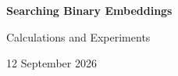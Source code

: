 \documentclass[11pt,a4paper]{article}
\begin{document}
{\Large\bfseries\color{Ink} Searching Binary Embeddings}\par
{\large Calculations and Experiments}\par
{\small 12 September 2026}\par





\end{document}
